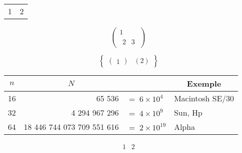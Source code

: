 


\newenvironment{coucou}{\begin{tabular}{cc}}{\end{tabular}}

\begin{coucou}
1 & 2
\end{coucou}
$$
\left(\begin{array}{c} 1 \\ \begin{array}{l}2 & 3\end{array}\end{array}\right)
$$

$$
\left\{\begin{array}{cc}
\left(\begin{array}{c}1\end{array}\right) &
\left(2\right)
\end{array}\right\}
$$

\begin{center}
\begin{tabular}{|r|rl|l|} \hline
\multicolumn{1}{|c}{$n$} & \multicolumn{1}{|c}{$N$} &  & 
                                             \multicolumn{1}{|c|}{Exemple}\\
\hline
16 & 65 536                      &  $= \; 6 \times 10^4$  & Macintosh SE/30 \\
\hline
32 & 4 294 967 296               &  $= \; 4 \times 10^9$  & Sun, Hp \\
\hline
64 & 18 446 744 073 709 551 616  &  $ = \; 2 \times 10^{19}$ & Alpha \\
\hline
\end{tabular}
\end{center}

$$
\begin{array}{ll}
1 & 2
\end{array}
$$

